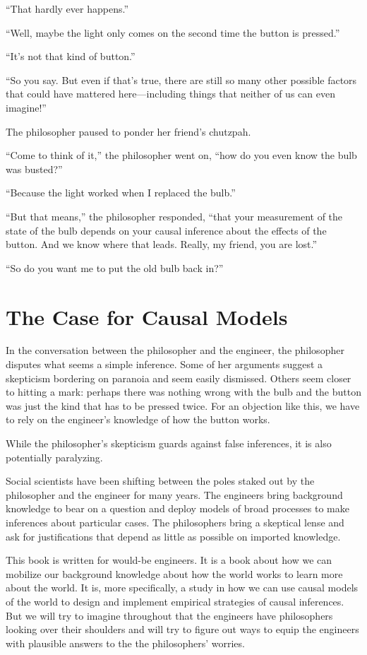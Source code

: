 \documentclass[12pt,]{book}
\begin{document}
``That hardly ever happens.''

``Well, maybe the light only comes on the second time the button is pressed.''

``It's not that kind of button.''

``So you say. But even if that's true, there are still so many other possible factors that could have mattered here---including things that neither of us can even imagine!''

The philosopher paused to ponder her friend's chutzpah.

``Come to think of it,'' the philosopher went on, ``how do you even know the bulb was busted?''

``Because the light worked when I replaced the bulb.''

``But that means,'' the philosopher responded, ``that your measurement of the state of the bulb depends on your causal inference about the effects of the button. And we know where that leads. Really, my friend, you are lost.''

``So do you want me to put the old bulb back in?''

\hypertarget{the-case-for-causal-models}{%
\section{The Case for Causal Models}\label{the-case-for-causal-models}}

In the conversation between the philosopher and the engineer, the philosopher disputes what seems a simple inference. Some of her arguments suggest a skepticism bordering on paranoia and seem easily dismissed. Others seem closer to hitting a mark: perhaps there was nothing wrong with the bulb and the button was just the kind that has to be pressed twice. For an objection like this, we have to rely on the engineer's knowledge of how the button works.

While the philosopher's skepticism guards against false inferences, it is also potentially paralyzing.

Social scientists have been shifting between the poles staked out by the philosopher and the engineer for many years. The engineers bring background knowledge to bear on a question and deploy models of broad processes to make inferences about particular cases. The philosophers bring a skeptical lense and ask for justifications that depend as little as possible on imported knowledge.

This book is written for would-be engineers. It is a book about how we can mobilize our background knowledge about how the world works to learn more about the world. It is, more specifically, a study in how we can use causal models of the world to design and implement empirical strategies of causal inferences. But we will try to imagine throughout that the engineers have philosophers looking over their shoulders and will try to figure out ways to equip the engineers with plausible answers to the the philosophers' worries.
\end{document}
